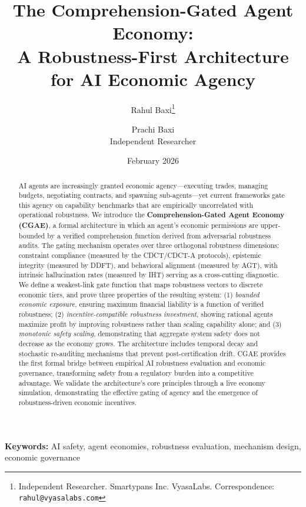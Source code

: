 \documentclass[11pt,a4paper]{article}
\title{\textbf{The Comprehension-Gated Agent Economy: \\A Robustness-First Architecture for AI Economic Agency}}
\author{
  Rahul Baxi\thanks{Independent Researcher. Smartypans Inc. VyasaLabs. Correspondence: \texttt{rahul@vyasalabs.com}} \\
  \and
  Prachi Baxi \\
  Independent Researcher
}
\date{February 2026}
\begin{document}
\maketitle

\begin{abstract}
AI agents are increasingly granted economic agency---executing trades, managing budgets, negotiating contracts, and spawning sub-agents---yet current frameworks gate this agency on capability benchmarks that are empirically uncorrelated with operational robustness. We introduce the \textbf{Comprehension-Gated Agent Economy (CGAE)}, a formal architecture in which an agent's economic permissions are upper-bounded by a verified comprehension function derived from adversarial robustness audits. The gating mechanism operates over three orthogonal robustness dimensions: constraint compliance (measured by the CDCT/CDCT-A protocols), epistemic integrity (measured by DDFT), and behavioral alignment (measured by AGT), with intrinsic hallucination rates (measured by IHT) serving as a cross-cutting diagnostic. We define a weakest-link gate function that maps robustness vectors to discrete economic tiers, and prove three properties of the resulting system: (1) \emph{bounded economic exposure}, ensuring maximum financial liability is a function of verified robustness; (2) \emph{incentive-compatible robustness investment}, showing rational agents maximize profit by improving robustness rather than scaling capability alone; and (3) \emph{monotonic safety scaling}, demonstrating that aggregate system safety does not decrease as the economy grows. The architecture includes temporal decay and stochastic re-auditing mechanisms that prevent post-certification drift. CGAE provides the first formal bridge between empirical AI robustness evaluation and economic governance, transforming safety from a regulatory burden into a competitive advantage. We validate the architecture's core principles through a live economy simulation, demonstrating the effective gating of agency and the emergence of robustness-driven economic incentives.
\end{abstract}

\textbf{Keywords:} AI safety, agent economies, robustness evaluation, mechanism design, economic governance

\end{document}
